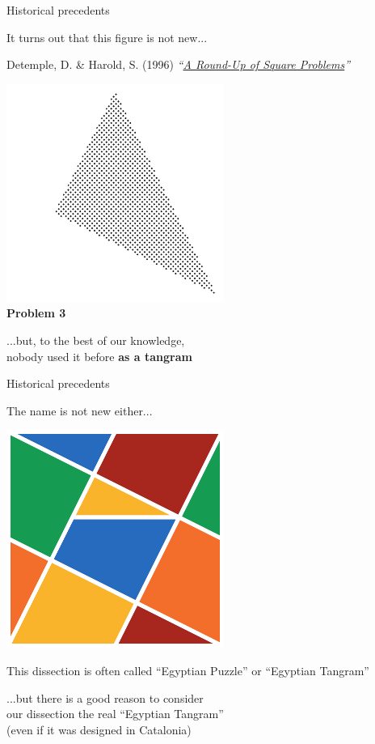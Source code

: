\documentclass[14pt]{beamer}
\begin{document}

    \begin{frame}{Historical precedents}
        \begin{center}
            It turns out that this figure is not new...

            \bigskip\medskip

            {\footnotesize Detemple, D. \& Harold, S. (1996) \emph{``\href{https://doi.org/10.2307/2691390}{A Round-Up of Square Problems}''}}\\

            \bigskip

            \includegraphics[height=14ex]{figures/figure000f.pdf}\\[-1ex]{\footnotesize \textbf{Problem 3}}

            \bigskip

            ...but, to the best of our knowledge,\\nobody used it before \textbf{as a tangram}
        \end{center}
    \end{frame}


    \begin{frame}{Historical precedents}
        \begin{center}
            The name is not new either...

            \bigskip \bigskip

            \includegraphics[height=15ex]{figures/figure000e.pdf}

            \medskip

            {\footnotesize This dissection is often called ``Egyptian Puzzle'' or ``Egyptian Tangram''}

            \bigskip \bigskip

            ...but there is a good reason to consider\\ our dissection the real ``Egyptian Tangram''\\{\footnotesize (even if it was designed in Catalonia)}
        \end{center}
    \end{frame}
\end{document}
